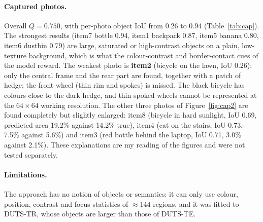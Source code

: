 \documentclass[11pt,a4paper]{article}
\begin{document}
\paragraph{Captured photos.} Overall $Q=0.750$, with per-photo object IoU from 0.26 to 0.94 (Table~\ref{tab:cap}). The strongest results (item7 bottle 0.94, item1 backpack 0.87, item5 banana 0.80, item6 dustbin 0.79) are large, saturated or high-contrast objects on a plain, low-texture background,
which is what the colour-contrast and border-contact cues of the model reward. The weakest photo is \textbf{item2} (bicycle on the lawn, IoU 0.26): only the central frame and the rear part are found, together with a patch of hedge; the front wheel (thin rim and spokes) is missed.
The black bicycle has colours close to the dark hedge, and thin spoked wheels cannot be represented at the $64{\times}64$ working resolution.
The other three photos of Figure~\ref{fig:cap2} are found completely but slightly enlarged: item8 (bicycle in hard sunlight, IoU 0.69, predicted area 19.2\% against 14.2\% true), item4 (cat on the stairs, IoU 0.73, 7.5\% against 5.6\%) and
item3 (red bottle behind the laptop, IoU 0.71, 3.0\% against 2.1\%). These explanations are my reading of the figures and were not tested separately.

\paragraph{Limitations.} The approach has no notion of objects or semantics: it can only use colour, position, contrast and focus statistics of $\approx$144 regions, and it was fitted to DUTS-TR, whose objects are larger than those of DUTS-TE.
\end{document}
